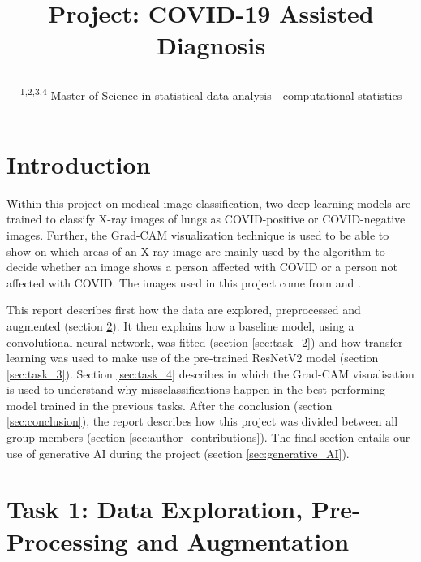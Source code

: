 \documentclass[conference]{IEEEtran}
\begin{document}
\title{Project: COVID-19 Assisted Diagnosis\\


\author{
\and
{}
\and
{}
\and
{}

\and


\textsuperscript{1,2,3,4}  Master of Science in statistical data analysis - computational statistics\hfill}}

\maketitle



\section{Introduction}
Within this project on medical image classification, two deep learning models are trained to classify X-ray images of lungs as COVID-positive or COVID-negative images. Further, the Grad-CAM visualization technique is used to be able to show on which areas of an X-ray image are mainly used by the algorithm to decide whether an image shows a person affected with COVID or a person not affected with COVID. The images used in this project come from \cite{dataset1} and \cite{dataset2}. 

This report describes first how the data are explored, preprocessed and augmented (section \ref{sec:task_1}). It then explains how a baseline model, using a convolutional neural network, was fitted (section \ref{sec:task_2}) and how transfer learning was used to make use of the pre-trained ResNetV2 model (section \ref{sec:task_3}). Section \ref{sec:task_4} describes in which the Grad-CAM visualisation is used to understand why missclassifications happen in the best performing model trained in the previous tasks.
After the conclusion (section \ref{sec:conclusion}), the report describes how this project was divided between all group members (section \ref{sec:author_contributions}). The final section entails our use of generative AI during the project (section \ref{sec:generative_AI}).


\section{Task 1: Data Exploration, Pre-Processing and Augmentation}\label{sec:task_1}
\end{document}
